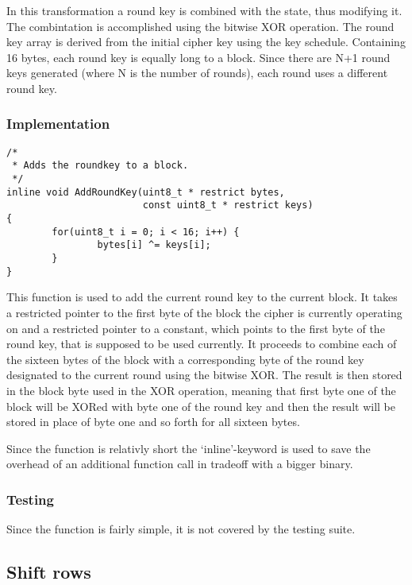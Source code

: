 In this transformation a round key is
combined with the state, thus modifying it. The combintation is
accomplished using the bitwise XOR operation. The round key array is
derived from the initial cipher key using the key schedule. Containing
16 bytes, each round key is equally long to a block. Since there are N+1
round keys generated (where N is the number of rounds), each round uses
a different round key.

\hypertarget{implementation-2}{%
\subsubsection{Implementation}\label{implementation-2}}

\begin{lstlisting}
/*
 * Adds the roundkey to a block.
 */
inline void AddRoundKey(uint8_t * restrict bytes, 
                        const uint8_t * restrict keys)
{
        for(uint8_t i = 0; i < 16; i++) {
                bytes[i] ^= keys[i];
        }
}
\end{lstlisting}

This function is used to add the current round key to the current block.
It takes a restricted pointer to the first byte of the block the cipher
is currently operating on and a restricted pointer to a constant, which
points to the first byte of the round key, that is supposed to be used
currently. It proceeds to combine each of the sixteen bytes of the block
with a corresponding byte of the round key designated to the current
round using the bitwise XOR. The result is then stored in the block byte
used in the XOR operation, meaning that first byte one of the block will
be XORed with byte one of the round key and then the result will be
stored in place of byte one and so forth for all sixteen bytes.

Since the function is relativly short the `inline'-keyword is used to
save the overhead of an additional function call in tradeoff with a
bigger binary.

\hypertarget{testing-2}{%
\subsubsection{Testing}\label{testing-2}}

Since the function is fairly simple, it is not covered by the testing
suite.

\hypertarget{shift-rows}{%
\subsection{Shift rows}\label{shift-rows}}

